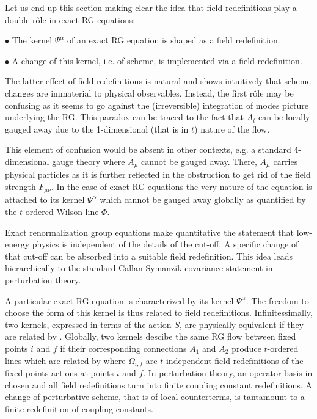Let us end up this section making clear the idea that
field redefinitions play a double r\^ole in exact RG equations:\par
$\bullet$ The kernel $\Psi^\alpha$ of an exact RG equation is shaped as
a field redefinition.\par
$\bullet$ A change of this kernel, i.e. of scheme, is implemented via a field
redefinition.
\par\noindent The latter effect of  field redefinitions is natural
and shows intuitively that scheme changes are immaterial to
 physical observables. Instead, the first r\^ole may be
 confusing as it seems to  go against the (irreversible) 
integration of modes picture underlying the RG. 
This paradox can be traced to the fact that $A_t$ can be locally gauged
away due to the 1-dimensional (that is in $t$)  nature of the flow.

This element of confusion would be absent in other contexts, e.g.
a standard 4-dimensional gauge theory where $A_\mu$ cannot be gauged away.
There, $A_\mu$ carries  physical
  particles  as it is further reflected in the 
obstruction to get rid of the field strength $F_{\mu\nu}$.
In the case of exact RG equations the very nature of the equation is 
attached to its kernel $\Psi^\alpha$ which cannot be gauged away globally
as quantified by the $t$-ordered Wilson line $\Phi$. 
  





  

Exact renormalization group equations make quantitative the statement that 
low-energy physics is independent of the details of the cut-off. A specific
 change of that cut-off can be absorbed into a suitable 
field redefinition. This idea leads hierarchically  
to the standard Callan-Symanzik covariance statement in perturbation theory.


A particular exact RG equation is characterized by its kernel $\Psi^\alpha$.
The freedom to choose the form of this kernel is thus  related to field
redefinitions. Infinitessimally, two kernels, expressed in terms of the
action $S$, are physically equivalent
 if they are related by \fsda. Globally, two kernels descibe the same
RG flow between fixed points $i$ and  $f$ if their
 corresponding connections $A_1$ and $A_2$ produce
$t$-ordered lines which are related by
\eqn{}
where $\Omega_{i,f}$ are $t$-independent field redefinitions of 
the fixed points actions at points $i$ and $f$. 
In perturbation theory, an operator basis in chosen and all field
redefinitions turn into finite coupling constant redefinitions. 
A change of perturbative scheme, that is of local counterterms,
is tantamount to a finite redefinition of coupling constants.


